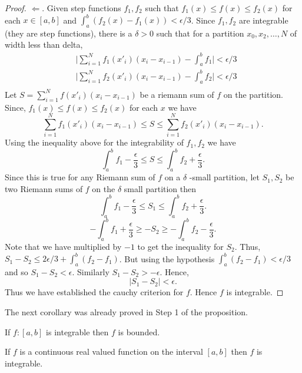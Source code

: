 \begin{proof}
$\Leftarrow$. Given step functions $f_1,f_2$ such that $f_1(x) \leq f(x) \leq f_2(x)$ for each 
   $ x \in \left[a,b\right]$ and $\int_a^b(f_2(x) - f_1(x)) < \epsilon/3$. Since $f_1,f_2$ are
   integrable (they are step functions), there is a $\delta > 0$ such that for a partition
   $x_0,x_2,\dots,N$ of width less than delta, 
   \begin{displaymath}
       \begin{aligned}
	   &\lvert \sum_{i=1}^N f_1(x'_i)(x_i - x_{i-1}) - \int_a^b f_1 \rvert < \epsilon/3 \\
	   &\lvert \sum_{i=1}^N f_2(x'_i)(x_i - x_{i-1}) - \int_a^b f_2 \rvert < \epsilon/3 \\
       \end{aligned}
   \end{displaymath}
   Let $S = \sum_{i = 1}^Nf(x'_i)(x_i - x_{i-1})$ be a riemann sum of $f$ on the partition. Since,
   $f_1(x) \leq f(x) \leq f_2(x)$ for each $x$ we have
   \[\sum_{i=1}^N f_1(x'_i)(x_i - x_{i-1}) \leq S \leq \sum_{i=1}^N f_2(x'_i)(x_i - x_{i-1}) .\]
   Using the inequality above for the integrability of $f_1,f_2$ we have
   \[\int_a^b f_1 - \frac{\epsilon}{3} \leq S \leq \int_a^b f_2 + \frac{\epsilon}{3}. \]Since this
   is true for any Riemann sum of $f$ on a $\delta$ -small partition, let $S_1,S_2$ be two Riemann
   sums of $f$ on the $\delta$ small partition then 
   \[\int_a^b f_1 - \frac{\epsilon}{3} \leq S_1 \leq \int_a^b f_2 + \frac{\epsilon}{3}. \]
   \[-\int_a^b f_1 + \frac{\epsilon}{3} \geq -S_2 \geq -\int_a^b f_2 - \frac{\epsilon}{3}. \]
   Note that we have multiplied by $-1$ to get the inequality for $S_2$. Thus,
   $S_1 - S_2 \leq 2\epsilon/3 + \int_a^b(f_2 - f_1)$. But using the hypothesis $
   \int_a^b(f_2 - f_1) < \epsilon/3$ and so $S_1 - S_2 < \epsilon$. Similarly $S_1 - S_2 >
   -\epsilon$. Hence,
   \[ \lvert S_1 - S_2 \rvert < \epsilon .\] Thus we have established the cauchy criterion for $f$.
   Hence $f$ is integrable.
\end{proof}
The next corollary was already proved in Step 1 of the proposition.
\begin{Corollary}
    If $f : \left[a,b\right]$ is integrable then $f$ is bounded.
\end{Corollary}
\begin{Theorem}[name=Continuous real valued function on compact sets are integrable]
    If $f$ is a continuous real valued function on the interval $\left[a,b\right]$ then $f$ is
    integrable.
\end{Theorem}
